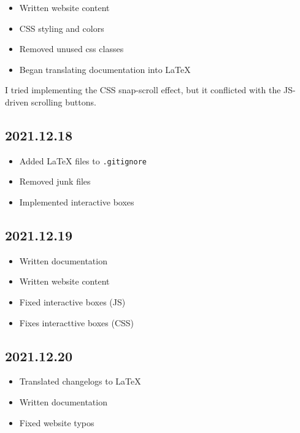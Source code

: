 \documentclass{article}
\begin{document}
\begin{itemize}
    \item Written website content
    \item CSS styling and colors
    \item Removed unused css classes
    \item Began translating documentation into LaTeX
\end{itemize}

I tried implementing the CSS snap-scroll effect,
but it conflicted with the JS-driven scrolling buttons.

\subsection*{2021.12.18}

\begin{itemize}
    \item Added LaTeX files to \texttt{.gitignore}
    \item Removed junk files
    \item Implemented interactive boxes
\end{itemize} %

\subsection*{2021.12.19}

\begin{itemize}
    \item Written documentation
    \item Written website content
    \item Fixed interactive boxes (JS)
    \item Fixes interacttive boxes (CSS)
\end{itemize} %

\subsection*{2021.12.20}

\begin{itemize}
    \item Translated changelogs to LaTeX
    \item Written documentation
    \item Fixed website typos
\end{itemize}
\end{document}
